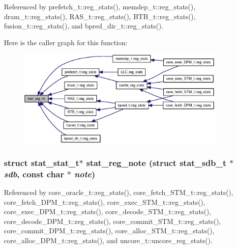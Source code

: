 Referenced by prefetch\_\-t::reg\_\-stats(), memdep\_\-t::reg\_\-stats(), dram\_\-t::reg\_\-stats(), RAS\_\-t::reg\_\-stats(), BTB\_\-t::reg\_\-stats(), fusion\_\-t::reg\_\-stats(), and bpred\_\-dir\_\-t::reg\_\-stats().

Here is the caller graph for this function:\nopagebreak
\begin{figure}[H]
\begin{center}
\leavevmode
\includegraphics[width=292pt]{zesto_2stats_8h_29b54a586f4845a6bb5dabbe04ad43be_icgraph}
\end{center}
\end{figure}
\subsubsection[{stat\_\-reg\_\-note}]{\setlength{\rightskip}{0pt plus 5cm}struct {\bf stat\_\-stat\_\-t}$\ast$ stat\_\-reg\_\-note (struct {\bf stat\_\-sdb\_\-t} $\ast$ {\em sdb}, \/  const char $\ast$ {\em note})\hspace{0.3cm}{\tt  [read]}}\label{zesto_2stats_8h_ed9b9c4535e4fc2e59a090d6e8157d4f}




Referenced by core\_\-oracle\_\-t::reg\_\-stats(), core\_\-fetch\_\-STM\_\-t::reg\_\-stats(), core\_\-fetch\_\-DPM\_\-t::reg\_\-stats(), core\_\-exec\_\-STM\_\-t::reg\_\-stats(), core\_\-exec\_\-DPM\_\-t::reg\_\-stats(), core\_\-decode\_\-STM\_\-t::reg\_\-stats(), core\_\-decode\_\-DPM\_\-t::reg\_\-stats(), core\_\-commit\_\-STM\_\-t::reg\_\-stats(), core\_\-commit\_\-DPM\_\-t::reg\_\-stats(), core\_\-alloc\_\-STM\_\-t::reg\_\-stats(), core\_\-alloc\_\-DPM\_\-t::reg\_\-stats(), and uncore\_\-t::uncore\_\-reg\_\-stats().

